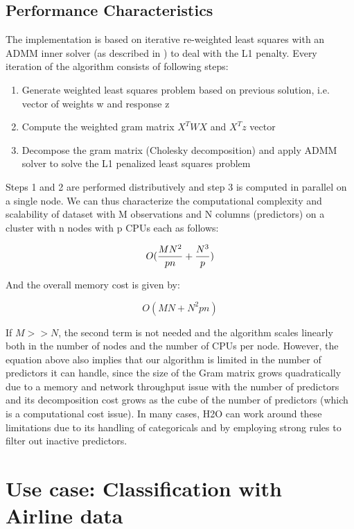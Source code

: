 \documentclass[11pt]{article}
\begin{document}
\subsection{Performance Characteristics}
The implementation is based on iterative re-weighted least squares with an ADMM inner solver (as described in ) to deal with the L1 penalty. Every iteration of the algorithm consists of following steps:
\begin{enumerate} 
\item Generate weighted least squares problem based on previous solution, i.e. vector of weights w and response z 
\item Compute the weighted gram matrix $X^TWX$ and $X^Tz$ vector
\item Decompose the gram matrix (Cholesky decomposition) and apply ADMM solver to solve the L1 penalized least squares problem
\end{enumerate}

Steps 1 and 2 are performed distributively and step 3 is computed in parallel on a single node. We can thus characterize the computational complexity and scalability of dataset with M observations and N columns (predictors) on a cluster with n nodes with p CPUs each as follows:

\[ O({MN^2 \over pn} + {N^3 \over p})\]

And the overall memory cost is given by:

\[ O(MN + N^2pn)\]

If $M >> N$, the second term is not needed and the algorithm scales linearly both in the number of nodes and the number of CPUs per node. However, the equation above also implies that our algorithm is limited in the number of predictors it can handle, since the size of the Gram matrix grows quadratically due to a memory and network throughput issue with the number of predictors and its decomposition cost grows as the cube of the number of predictors (which is a computational cost issue). In many cases, H2O can work around these limitations due to its handling of categoricals and by employing strong rules to filter out inactive predictors.  


\section{Use case: Classification with Airline data}
\end{document}
